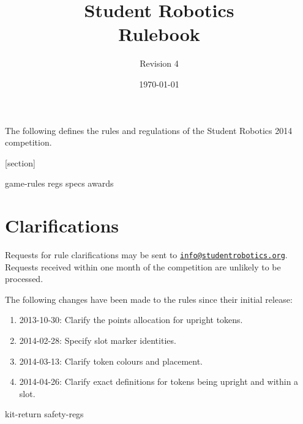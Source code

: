 \documentclass[a4paper, 11pt]{scrartcl}
\title {Student Robotics \sryear\\ Rulebook}
\author{Revision 4}
\date{\today}
\newcommand{\sryear}{2014}
\begin{document}
\maketitle

\noindent The following defines the rules and regulations of the Student Robotics \sryear {} competition.

[section]
\newcommand{\rcn}{\stepcounter{rule}\arabic{section}.\arabic{rule}}
\renewcommand{\labelenumi}{\rcn}

 {game-rules}
\newpage
 {regs}
\newpage
 {specs}
\newpage
 {awards}

\renewcommand{\labelenumi}{\rcn}

\section{Clarifications}
Requests for rule clarifications may be sent to \href{mailto:info@studentrobotics.org}{\nolinkurl{info@studentrobotics.org}}.
Requests received within one month of the competition are unlikely to be processed.

The following changes have been made to the rules since their initial release:

\begin{enumerate}
  \item 2013-10-30: Clarify the points allocation for upright tokens.
  \item 2014-02-28: Specify slot marker identities.
  \item 2014-03-13: Clarify token colours and placement.
  \item 2014-04-26: Clarify exact definitions for tokens being upright and within a slot.
\end{enumerate}

\newpage
\appendix
\appendixpage
\addappheadtotoc
 {kit-return}
 {safety-regs}
\end{document}
